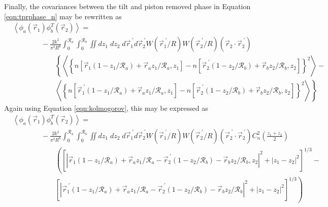 Finally, the covariances between the tilt and piston removed phase in Equation \ref{eqn:tprphase_n} may be rewritten as 
\begin{equation}\label{eqn:tprphase_n2}
\begin{aligned}
&\left\langle \phi_{a}\left(\vec{r}_{1}\right) \phi^{T}_{b}\left(\vec{r}_{2}\right)\right\rangle = \\
&\quad\quad\quad\quad
-\frac{2k^{2}}{\pi^{2}R^{6}} \int_{0}^{\mathcal{R}_{a}}  \int_{0}^{\mathcal{R}_{b}} \iint dz_{1} \; dz_{2} \; d\vec{r}^{\;\prime}_{1}d\vec{r}^{\;\prime}_{2} W(\vec{r}^{\;\prime}_{1}/R) W(\vec{r}^{\;\prime}_{2}/R)
\left(\vec{r}_{2} \cdot \vec{r}^{\;\prime}_{2}\right)
\\
&\quad\quad\quad\quad\quad\quad
\left\{
\left\langle \left\{n\left[\vec{r}_{1}\left(1-z_{1}/\mathcal{R}_{a}\right) + \vec{r}_{a} z_{1}/\mathcal{R}_{a}, z_{1}\right] -
 n\left[\vec{r}^{\;\prime}_{2}\left(1-z_{2}/\mathcal{R}_{b}\right) + \vec{r}_{b} z_{2}/\mathcal{R}_{b}, z_{2}\right] \right\}^{2}\right\rangle 
\right. -
\\
&\quad\quad\quad\quad\quad\quad
\left.
\left\langle \left\{ n\left[\vec{r}^{\;\prime}_{1}\left(1-z_{1}/\mathcal{R}_{a}\right) + \vec{r}_{a} z_{1}/\mathcal{R}_{a}, z_{1}\right]- 
 n\left[\vec{r}^{\;\prime}_{2}\left(1-z_{2}/\mathcal{R}_{b}\right) + \vec{r}_{b} z_{2}/\mathcal{R}_{b}, z_{2}\right] \right\}^{2}\right\rangle
\right\}
\end{aligned}
\end{equation}
Again using Equation \ref{eqn:kolmogorov}, this may be expressed as
\begin{equation}\label{eqn:tprphase_n3}
\begin{aligned}
&\left\langle \phi_{a}\left(\vec{r}_{1}\right) \phi^{T}_{b}\left(\vec{r}_{2}\right)\right\rangle = \\
&\quad\quad\quad\quad
-\frac{2k^{2}}{\pi^{2}R^{6}} \int_{0}^{\mathcal{R}_{a}}  \int_{0}^{\mathcal{R}_{b}} \iint dz_{1} \; dz_{2} \; d\vec{r}^{\;\prime}_{1}d\vec{r}^{\;\prime}_{2} W(\vec{r}^{\;\prime}_{1}/R) W(\vec{r}^{\;\prime}_{2}/R)
\left(\vec{r}^{\;\prime}_{2} \cdot \vec{r}^{\;\prime}_{2}\right)
C_{n}^{2}\left(\frac{z_{1} + z_{2}}{2}\right) 
\\
&\quad\quad\quad\quad\quad\quad
\left(
\left[\left\vert \vec{r}_{1}\left(1-z_{1}/\mathcal{R}_{a}\right) + \vec{r}_{a} z_{1}/\mathcal{R}_{a} - \vec{r}^{\;\prime}_{2}\left(1-z_{2}/\mathcal{R}_{b}\right) - \vec{r}_{b} z_{2}/\mathcal{R}_{b}, z_{2}\right\vert^{2}   + 
\left\vert z_{1} - z_{2} \right\vert^{2}\right]^{1/3}
\right. -
\\
&\quad\quad\quad\quad\quad\quad
\left.
\left[ \left\vert \vec{r}^{\;\prime}_{1}\left(1-z_{1}/\mathcal{R}_{a}\right) + \vec{r}_{a} z_{1}/\mathcal{R}_{a} - 
 \vec{r}^{\;\prime}_{2}\left(1-z_{2}/\mathcal{R}_{b}\right) - \vec{r}_{b} z_{2}/\mathcal{R}_{b}\right\vert^{2} + 
\left\vert z_{1} - z_{2} \right\vert^{2}\right]^{1/3}
\right)
\end{aligned}
\end{equation}

